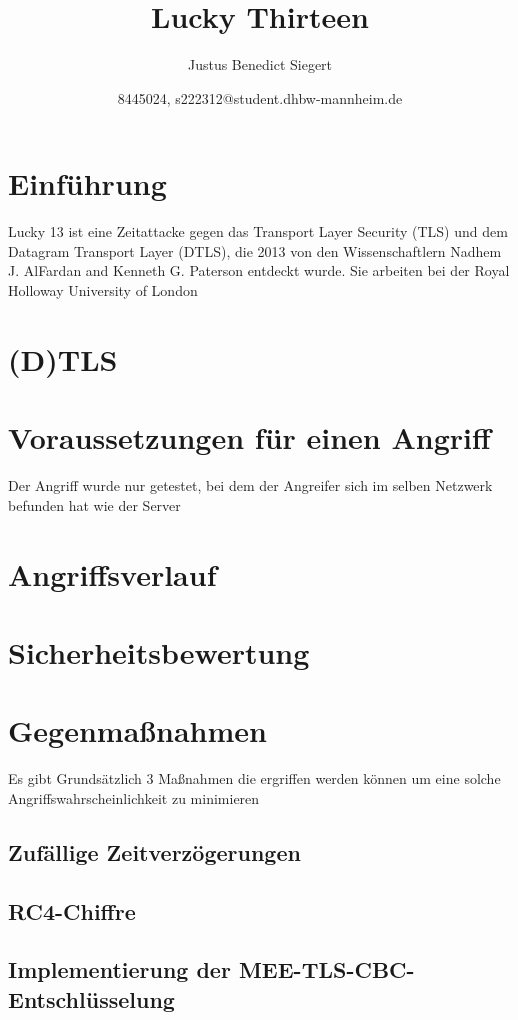 \documentclass[a4paper,11pt]{scrartcl}
\begin{document}
    \title{Lucky Thirteen}
    \author{Justus Benedict Siegert}
    \date{8445024, s222312@student.dhbw-mannheim.de}
    \maketitle
    \tableofcontents


    \section{Einführung}\label{sec:einfuhrung}
    Lucky 13 ist eine Zeitattacke gegen das Transport Layer Security (TLS) und dem Datagram Transport Layer (DTLS),
    die 2013 von den Wissenschaftlern Nadhem J. AlFardan and Kenneth G. Paterson entdeckt wurde.
    Sie arbeiten bei der Royal Holloway University of London


    \section{(D)TLS}\label{sec:(d)tls}


    \section{Voraussetzungen für einen Angriff}\label{sec:voraussetzungen-fur-einen-angriff}
    Der Angriff wurde nur getestet, bei dem der Angreifer sich im selben Netzwerk befunden hat wie der Server\cite[S. 11]{AlFardan2013}


    \section{Angriffsverlauf}\label{sec:angriffsverlauf}


    \section{Sicherheitsbewertung}\label{sec:sicherheitsbewertung}


    \section{Gegenmaßnahmen}\label{sec:gegenmanahmen}
    Es gibt Grundsätzlich 3 Maßnahmen die ergriffen werden können um eine solche Angriffswahrscheinlichkeit zu minimieren

    \subsection{Zufällige Zeitverzögerungen}

    \subsection{RC4-Chiffre}

    \subsection{Implementierung der MEE-TLS-CBC-Entschlüsselung}
    \newpage

    
\end{document}
